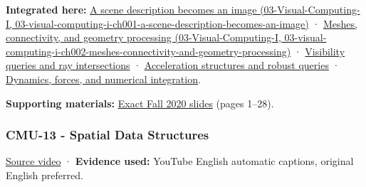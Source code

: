 \textbf{Integrated here:} \href{../03-Visual-Computing-I/main.pdf\#nameddest=03-visual-computing-i-ch001-a-scene-description-becomes-an-image}{A scene description becomes an image (03-Visual-Computing-I, 03-visual-computing-i-ch001-a-scene-description-becomes-an-image)} · \href{../03-Visual-Computing-I/main.pdf\#nameddest=03-visual-computing-i-ch002-meshes-connectivity-and-geometry-processing}{Meshes, connectivity, and geometry processing (03-Visual-Computing-I, 03-visual-computing-i-ch002-meshes-connectivity-and-geometry-processing)} · \hyperref[04-visual-computing-ii-ch028-visibility-queries-and-ray-intersections-1]{Visibility queries and ray intersections} · \hyperref[04-visual-computing-ii-ch029-acceleration-structures-and-robust-queries-1]{Acceleration structures and robust queries} · \hyperref[04-visual-computing-ii-ch029-dynamics-forces-and-numerical-integration]{Dynamics, forces, and numerical integration}.

\textbf{Supporting materials:} \href{https://15462.courses.cs.cmu.edu/fall2020content/lectures/12_geometricqueries/12_geometricqueries_slides.pdf}{Exact Fall 2020 slides} (pages 1--28).

\subsubsection{CMU-13 - Spatial Data Structures}\label{04-visual-computing-ii-ch036-cmu-13---spatial-data-structures}

\href{https://www.youtube.com/watch?v=NF7r-pC8fFc}{Source video} · \textbf{Evidence used:} YouTube English automatic captions, original English preferred.

